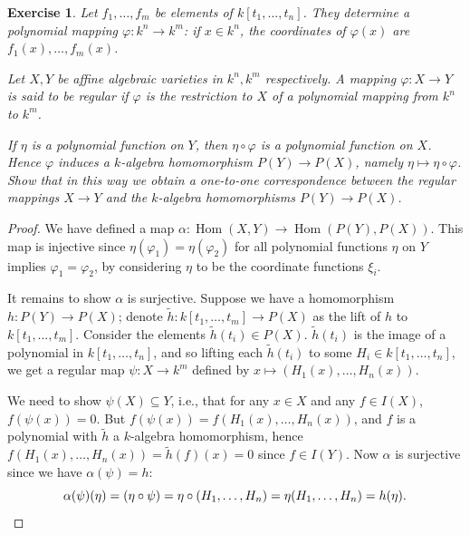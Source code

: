 \documentclass[12pt,letterpaper]{article}
\newtheorem{problem}{Exercise}[section]
\theoremstyle{definition}
\theoremstyle{remark}
\numberwithin{figure}{problem}
\numberwithin{equation}{section}
\DeclareMathOperator{\Hom}{Hom}
\begin{document}
\begin{problem}
  Let
  $f_1,\ldots,f_m$ be elements of
  $k[t_1,\ldots,t_n]$.
  They determine a \emph{polynomial mapping}
  $\varphi \colon k^n \to
  k^m$: if
  $x \in
  k^n$, the coordinates of
  $\varphi(x)$ are
  $f_1(x),\ldots,f_m(x)$.
  \par Let
  $X,Y$ be affine algebraic varieties in
  $k^n,k^m$ respectively.
  A mapping
  $\varphi\colon X \to
  Y$ is said to be \emph{regular} if
  $\varphi$ is the restriction to
  $X$ of a polynomial mapping from
  $k^n$ to
  $k^m$.
  \par If
  $\eta$ is a polynomial function on
  $Y$, then
  $\eta \circ
  \varphi$ is a polynomial function on
  $X$.
  Hence
  $\varphi$ induces a
  $k$-algebra homomorphism
  $P(Y) \to
  P(X)$, namely
  $\eta \mapsto \eta \circ
  \varphi$.
  Show that in this way we obtain a one-to-one correspondence between the regular mappings
  $X \to
  Y$ and the
  $k$-algebra homomorphisms
  $P(Y) \to
  P(X)$.
\end{problem}
\begin{proof}
  We have defined a map
  $\alpha\colon\Hom(X,Y) \to
  \Hom(P(Y),P(X))$.
  This map is injective since
  $\eta(\varphi_1) =
  \eta(\varphi_2)$ for all polynomial functions
  $\eta$ on
  $Y$ implies
  $\varphi_1 =
  \varphi_2$, by considering
  $\eta$ to be the coordinate functions
  $\xi_i$.
  \par It remains to show
  $\alpha$ is surjective.
  Suppose we have a homomorphism
  $h \colon P(Y) \to
  P(X)$; denote
  $\tilde{h}\colon k[t_1,\ldots,t_m] \to
  P(X)$ as the lift of
  $h$ to
  $k[t_1,\ldots,t_m]$.
  Consider the elements
  $\tilde{h}(t_i) \in
  P(X)$.
  $\tilde{h}(t_i)$ is the image of a polynomial in
  $k[t_1,\ldots,t_n]$, and so lifting each
  $\tilde{h}(t_i)$ to some
  $H_i \in
  k[t_1,\ldots,t_n]$, we get a regular map
  $\psi \colon X \to
  k^m$ defined by
  $x \mapsto
  (H_1(x),\ldots,H_n(x))$.
  \par We need to show
  $\psi(X) \subseteq
  Y$, i.e., that for any
  $x \in
  X$ and any
  $f \in
  I(X)$,
  $f(\psi(x)) =
  0$.
  But
  $f(\psi(x)) =
  f(H_1(x),\ldots,H_n(x))$, and
  $f$ is a polynomial with
  $\tilde{h}$ a
  $k$-algebra homomorphism, hence
  $f(H_1(x),\ldots,H_n(x)) = \tilde{h}(f)(x) =
  0$ since
  $f \in
  I(Y)$.
  Now
  $\alpha$ is surjective since we have
  $\alpha(\psi) =
  h$:
  \begin{equation*}
    \alpha(\psi)(\eta) = (\eta \circ \psi) = \eta \circ (H_1,\ldots,H_n) = \eta(H_1,\ldots,H_n) = h(\eta).\qedhere
  \end{equation*}
\end{proof}

\printbibliography
\end{document}
